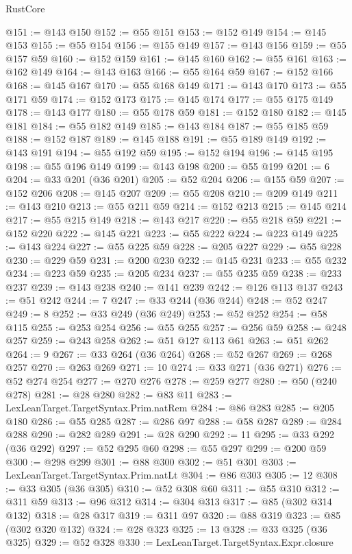 \begin{lexlean}{RustCore}
\begin{coremodule}
@151 := @143 @150
@152 := @55 @151
@153 := @152 @149
@154 := @145 @153
@155 := @55 @154
@156 := @155 @149
@157 := @143 @156
@159 := @55 @157 @59
@160 := @152 @159
@161 := @145 @160
@162 := @55 @161
@163 := @162 @149
@164 := @143 @163
@166 := @55 @164 @59
@167 := @152 @166
@168 := @145 @167
@170 := @55 @168 @149
@171 := @143 @170
@173 := @55 @171 @59
@174 := @152 @173
@175 := @145 @174
@177 := @55 @175 @149
@178 := @143 @177
@180 := @55 @178 @59
@181 := @152 @180
@182 := @145 @181
@184 := @55 @182 @149
@185 := @143 @184
@187 := @55 @185 @59
@188 := @152 @187
@189 := @145 @188
@191 := @55 @189 @149
@192 := @143 @191
@194 := @55 @192 @59
@195 := @152 @194
@196 := @145 @195
@198 := @55 @196 @149
@199 := @143 @198
@200 := @55 @199
@201 := 6
@204 := @33 @201 (@36 @201)
@205 := @52 @204
@206 := @155 @59
@207 := @152 @206
@208 := @145 @207
@209 := @55 @208
@210 := @209 @149
@211 := @143 @210
@213 := @55 @211 @59
@214 := @152 @213
@215 := @145 @214
@217 := @55 @215 @149
@218 := @143 @217
@220 := @55 @218 @59
@221 := @152 @220
@222 := @145 @221
@223 := @55 @222
@224 := @223 @149
@225 := @143 @224
@227 := @55 @225 @59
@228 := @205 @227
@229 := @55 @228
@230 := @229 @59
@231 := @200 @230
@232 := @145 @231
@233 := @55 @232
@234 := @223 @59
@235 := @205 @234
@237 := @55 @235 @59
@238 := @233 @237
@239 := @143 @238
@240 := @141 @239
@242 := @126 @113 @137
@243 := @51 @242
@244 := 7
@247 := @33 @244 (@36 @244)
@248 := @52 @247
@249 := 8
@252 := @33 @249 (@36 @249)
@253 := @52 @252
@254 := @58 @115
@255 := @253 @254
@256 := @55 @255
@257 := @256 @59
@258 := @248 @257
@259 := @243 @258
@262 := @51 @127 @113 @61
@263 := @51 @262
@264 := 9
@267 := @33 @264 (@36 @264)
@268 := @52 @267
@269 := @268 @257
@270 := @263 @269
@271 := 10
@274 := @33 @271 (@36 @271)
@276 := @52 @274 @254
@277 := @270 @276
@278 := @259 @277
@280 := @50 (@240 @278)
@281 := @28 @280
@282 := @83 @11
@283 := LexLeanTarget.TargetSyntax.Prim.natRem
@284 := @86 @283
@285 := @205 @180
@286 := @55 @285
@287 := @286 @97
@288 := @58 @287
@289 := @284 @288
@290 := @282 @289
@291 := @28 @290
@292 := 11
@295 := @33 @292 (@36 @292)
@297 := @52 @295 @60
@298 := @55 @297
@299 := @200 @59
@300 := @298 @299
@301 := @88 @300
@302 := @51 @301
@303 := LexLeanTarget.TargetSyntax.Prim.natLt
@304 := @86 @303
@305 := 12
@308 := @33 @305 (@36 @305)
@310 := @52 @308 @60
@311 := @55 @310
@312 := @311 @59
@313 := @96 @312
@314 := @304 @313
@317 := @85 (@302 @314 @132)
@318 := @28 @317
@319 := @311 @97
@320 := @88 @319
@323 := @85 (@302 @320 @132)
@324 := @28 @323
@325 := 13
@328 := @33 @325 (@36 @325)
@329 := @52 @328
@330 := LexLeanTarget.TargetSyntax.Expr.closure

\end{coremodule}
\end{lexlean}
